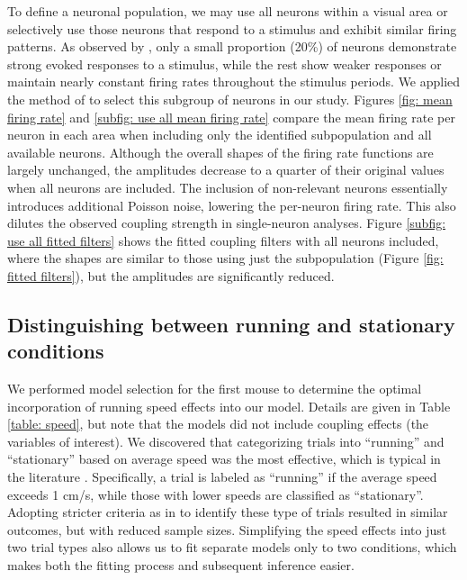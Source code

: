 \documentclass[12pt]{article}
\begin{document}
To define a neuronal population, we may use all neurons within a visual area or selectively use those neurons that respond to a stimulus and exhibit similar firing patterns. As observed by \citet{chen2022population}, only a small proportion (20\%) of neurons demonstrate strong evoked responses to a stimulus, while the rest show weaker responses or maintain nearly constant firing rates throughout the stimulus periods. We applied the method of \citet{chen2022population} to select this subgroup of neurons in our study. Figures \ref{fig: mean firing rate} and \ref{subfig: use all mean firing rate} compare the mean firing rate per neuron in each area when including only the identified subpopulation and all available neurons. Although the overall shapes of the firing rate functions are largely unchanged, the amplitudes decrease to a quarter of their original values when all neurons are included. The inclusion of non-relevant neurons essentially introduces additional Poisson noise, lowering the per-neuron firing rate. This also dilutes the observed coupling strength in single-neuron analyses. Figure \ref{subfig: use all fitted filters} shows the fitted coupling filters with all neurons included, where the shapes are similar to those using just the subpopulation (Figure \ref{fig: fitted filters}), but the amplitudes are significantly reduced.


\subsection{Distinguishing between running and stationary conditions}
We performed model selection for the first mouse to determine the optimal incorporation of running speed effects into our model. Details are given in Table \ref{table: speed}, but note that the models did not include coupling effects (the variables of interest). We discovered that categorizing trials into ``running'' and ``stationary'' based on average speed was the most effective, which is typical in the literature \cite{niell2010modulation, keller2012sensorimotor, dadarlat2017locomotion, pillow2022reduced}. Specifically, a trial is labeled as ``running'' if the average speed exceeds 1 cm/s, while those with lower speeds are classified as ``stationary''. Adopting stricter criteria as in \citep{pillow2022reduced} to identify these type of trials resulted in similar outcomes, but with reduced sample sizes. Simplifying the speed effects into just two trial types also allows us to fit separate models only to two conditions, which makes both the fitting process and subsequent inference easier.
\end{document}
